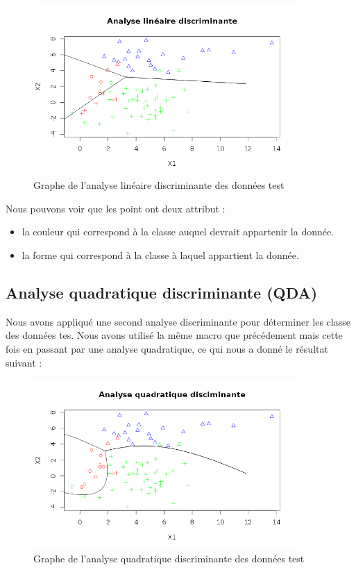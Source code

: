 \documentclass[a4paper,11pt]{article}
\begin{document}
  \begin{figure}[h]
   \center
   \includegraphics[width=10cm]{lineaire_discri.png}
   \caption{Graphe de l'analyse linéaire discriminante des données test}
  \end{figure}
  
  Nous pouvons voir que les point ont deux attribut :
  \begin{itemize}
   \item la couleur qui correspond à la classe auquel devrait appartenir la donnée.
   \item la forme qui correspond à la classe à laquel appartient la donnée.
  \end{itemize}
  
  
  \subsection{Analyse quadratique discriminante (QDA)}
  
  Nous avons appliqué une second analyse discriminante pour déterminer les classe des données tes.
  Nous avons utilisé la même macro que précédement mais cette fois en passant par une analyse quadratique, 
  ce qui nous a donné le résultat suivant :\\
  
  \begin{figure}[h]
   \center
   \includegraphics[width=10cm]{quadratique.png}
   \caption{Graphe de l'analyse quadratique discriminante des données test}
  \end{figure}
  
\end{document}
